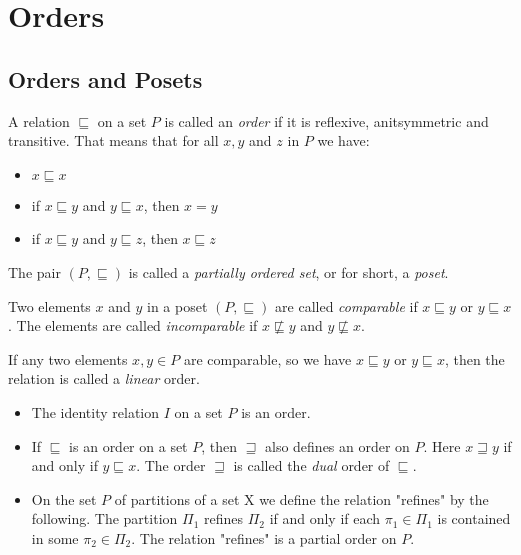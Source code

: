 \section{Orders}

\subsection{Orders and Posets}

\begin{definition}
    A relation $\sqsubseteq$ on a set $P$ is called an \emph{order} if it is reflexive, anitsymmetric and transitive.
    That means that for all $ x,y $ and $z$ in $P$ we have:
    \begin{itemize}
        \item $ x \sqsubseteq x $
        \item if $ x \sqsubseteq y $ and $ y \sqsubseteq x $, then $ x = y $
        \item if $ x \sqsubseteq y $ and $ y \sqsubseteq z $, then $ x \sqsubseteq z $
    \end{itemize}
    \par The pair $ (P, \sqsubseteq) $ is called a \emph{partially ordered set}, or for short, a \emph{poset}.
    \par Two elements $x$ and $y$ in a poset $ (P, \sqsubseteq) $ are called \emph{comparable} if $ x \sqsubseteq y $ or $ y \sqsubseteq x $.
    The elements are called \emph{incomparable} if $ x \not \sqsubseteq y $ and $ y \not\sqsubseteq x $.
    \par If any two elements $ x,y \in P $ are comparable, so we have $ x \sqsubseteq y $ or $ y \sqsubseteq x $, then the relation is called a \emph{linear} order.
\end{definition}

\begin{example}
    \begin{itemize}
        \item The identity relation $I$ on a set $P$ is an order.
        \item If $ \sqsubseteq $ is an order on a set $P$, then $ \sqsupseteq $
        also defines an order on $P$. Here $ x \sqsupseteq y $ if and only if
        $ y \sqsubseteq x $. The order $ \sqsupseteq $ is called the \emph{dual}
        order of $ \sqsubseteq $.
        \item On the set $P$ of partitions of a set X we define the relation
        "refines" by the following. The partition $ \Pi_1 $ refines $ \Pi_2 $ if
        and only if each $ \pi_1 \in \Pi_1 $ is contained in some $ \pi_2 \in \Pi_2 $.
        The relation "refines" is a partial order on $P$.
    \end{itemize}
\end{example}


